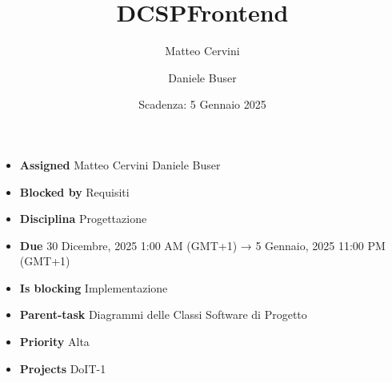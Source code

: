 \title{DCSPFrontend}
\author{Matteo Cervini \and Daniele Buser}
\date{Scadenza: 5 Gennaio 2025}

\maketitle

\begin{itemize}
    \item \textbf{Assigned} Matteo Cervini Daniele Buser
    \item \textbf{Blocked by} Requisiti
    \item \textbf{Disciplina} Progettazione
    \item \textbf{Due} 30 Dicembre, 2025 1:00 AM (GMT+1) → 5 Gennaio, 2025 11:00 PM (GMT+1)
    \item \textbf{Is blocking} Implementazione
    \item \textbf{Parent-task} Diagrammi delle Classi Software di Progetto
    \item \textbf{Priority} Alta
    \item \textbf{Projects} DoIT-1
\end{itemize}